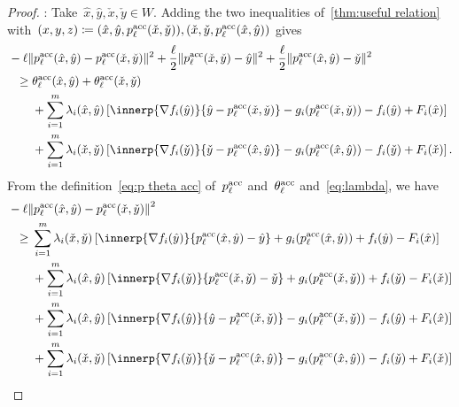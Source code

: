 \documentclass[../main]{subfiles}
\begin{document}
\begin{proof}
    :
    Take~$\hat{x}, \hat{y}, \check{x}, \check{y} \in W$.
    Adding the two inequalities of~\cref{thm:useful relation} with~$(x, y, z) \coloneqq (\hat{x}, \hat{y}, p^{\mathrm{acc}}_\ell(\check{x}, \check{y})), (\check{x}, \check{y}, p^{\mathrm{acc}}_\ell(\hat{x}, \hat{y}))$ gives
    \begin{align}
        \MoveEqLeft - \ell \norm{p^\acc_\ell(\hat{x}, \hat{y}) - p^\acc_\ell(\check{x}, \check{y})}^2 + \frac{\ell}{2} \norm{p^\acc_\ell(\check{x}, \check{y}) - \hat{y}}^2 + \frac{\ell}{2} \norm{p^\acc_\ell(\hat{x}, \hat{y}) - \check{y}}^2 \\
        \ge{}& \theta^\acc_\ell(\hat{x}, \hat{y}) + \theta^\acc_\ell(\check{x}, \check{y}) \\
           &+ \sum_{i = 1}^{m} \lambda_i(\hat{x}, \hat{y}) \left[ \innerp{\nabla f_i(\hat{y})}{\hat{y} - p^\acc_\ell(\check{x}, \check{y})} - g_i(p^\acc_\ell(\check{x}, \check{y})) - f_i(\hat{y}) + F_i(\hat{x}) \right] \\
           &+ \sum_{i = 1}^{m} \lambda_i(\check{x}, \check{y}) \left[ \innerp{\nabla f_i(\check{y})}{\check{y} - p^\acc_\ell(\hat{x}, \hat{y})} - g_i(p^\acc_\ell(\hat{x}, \hat{y})) - f_i(\check{y}) + F_i(\check{x}) \right]  
    .\end{align}
    From the definition~\cref{eq:p theta acc} of~$p^{\mathrm{acc}}_\ell$ and~$\theta^{\mathrm{acc}}_\ell$ and~\cref{eq:lambda}, we have
    \begin{align}
        \MoveEqLeft - \ell \norm*{p^\acc_\ell(\hat{x}, \hat{y}) - p^\acc_\ell(\check{x}, \check{y})}^2 \\
        \ge{}& \sum_{i = 1}^{m} \lambda_i(\check{x}, \check{y}) \left[ \innerp{\nabla f_i(\hat{y})}{p^\acc_\ell(\hat{x}, \hat{y}) - \hat{y}} + g_i(p^\acc_\ell(\hat{x}, \hat{y})) + f_i(\hat{y}) - F_i(\hat{x}) \right] \\ 
             &+ \sum_{i = 1}^{m} \lambda_i(\hat{x}, \hat{y}) \left[ \innerp{\nabla f_i(\check{y})}{p^\acc_\ell(\check{x}, \check{y}) - \check{y}} + g_i(p^\acc_\ell(\check{x}, \check{y})) + f_i(\check{y}) - F_i(\check{x}) \right] \\
             &+ \sum_{i = 1}^{m} \lambda_i(\hat{x}, \hat{y}) \left[ \innerp{\nabla f_i(\hat{y})}{\hat{y} - p^\acc_\ell(\check{x}, \check{y})} - g_i(p^\acc_\ell(\check{x}, \check{y})) - f_i(\hat{y}) + F_i(\hat{x}) \right] \\
             &+ \sum_{i = 1}^{m} \lambda_i(\check{x}, \check{y}) \left[ \innerp{\nabla f_i(\check{y})}{\check{y} - p^\acc_\ell(\hat{x}, \hat{y})} - g_i(p^\acc_\ell(\hat{x}, \hat{y})) - f_i(\check{y}) + F_i(\check{x}) \right] \\

\end{align}
\end{proof}
\end{document}
